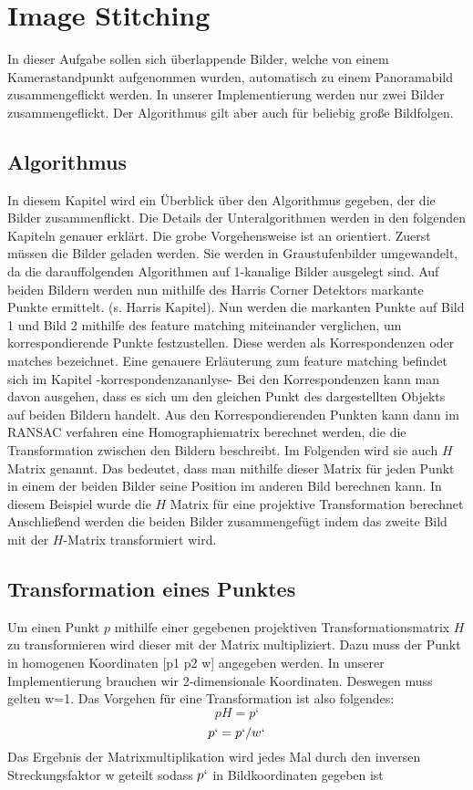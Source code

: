 \newcommand\todo[1]{
\newline
\textcolor{red}{#1}
}

\section{Image Stitching}
\label{sec:imageStitching}
In dieser Aufgabe sollen sich überlappende Bilder, welche von einem Kamerastandpunkt aufgenommen wurden, automatisch zu einem Panoramabild zusammengeflickt werden. In unserer Implementierung werden nur zwei Bilder zusammengeflickt. Der Algorithmus gilt aber auch für beliebig große Bildfolgen.
\subsection{Algorithmus}
In diesem Kapitel wird ein Überblick über den Algorithmus gegeben, der die Bilder zusammenflickt. Die Details der Unteralgorithmen werden in den folgenden Kapiteln genauer erklärt. Die grobe Vorgehensweise ist an \cite{Richard2000} orientiert. Zuerst müssen die Bilder geladen werden. Sie werden in Graustufenbilder umgewandelt, da die darauffolgenden Algorithmen auf 1-kanalige Bilder ausgelegt sind.
Auf beiden Bildern werden nun mithilfe des Harris Corner Detektors markante Punkte ermittelt. (s. Harris Kapitel). Nun werden die markanten Punkte auf Bild 1 und Bild 2 mithilfe des feature matching miteinander verglichen, um korrespondierende Punkte festzustellen. Diese werden als Korrespondenzen oder matches bezeichnet. Eine genauere Erläuterung zum feature matching befindet sich im Kapitel -korrespondenzananlyse- Bei den Korrespondenzen kann man davon ausgehen, dass es sich um den gleichen Punkt des dargestellten Objekts auf beiden Bildern handelt.
Aus den Korrespondierenden Punkten kann dann im RANSAC verfahren eine Homographiematrix berechnet werden, die die Transformation zwischen den Bildern beschreibt. Im Folgenden wird sie auch $H$ Matrix genannt. Das bedeutet, dass man mithilfe dieser Matrix für jeden Punkt in einem der beiden Bilder seine Position im anderen Bild berechnen kann.  In diesem Beispiel wurde die $H$ Matrix für eine projektive Transformation berechnet
Anschließend werden die beiden Bilder zusammengefügt indem das zweite Bild mit der $H$-Matrix transformiert wird.

\subsection{Transformation eines Punktes}
Um einen Punkt $p$ mithilfe einer gegebenen projektiven Transformationsmatrix $H$ zu transformieren wird dieser mit der Matrix multipliziert. Dazu muss der Punkt in homogenen Koordinaten [p1 p2 w] angegeben werden. In unserer Implementierung brauchen wir 2-dimensionale Koordinaten. Deswegen muss gelten w=1. Das Vorgehen für eine Transformation ist also folgendes:
$$p H=p‘$$
$$p`=p`/w`$$
Das Ergebnis der Matrixmultiplikation wird jedes Mal durch den inversen Streckungsfaktor w geteilt sodass $p`$ in Bildkoordinaten gegeben ist

